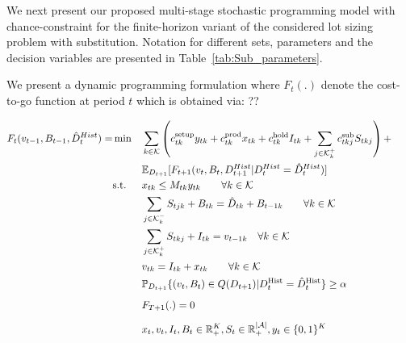 \documentclass[10pt]{article}
\newcommand{\ti}{t} %
\newcommand{\Ti}{T}
\newcommand{\ka}{k} %
\newcommand{\KA}{\mathcal{K}}
\newcommand{\Ka}{K}
\newcommand{\jey}{j} %
\newcommand{\Graf}{\mathcal{A}} %
\newcommand{\Bi}{B} %
\newcommand{\Vi}{v} %
\newcommand{\Es}{S} %
\newcommand{\x}{x} %
\newcommand{\y}{y} %
\newcommand{\InvPos}{inventory level after production }
\newcommand{\Csub}{\mathcal{K}^+_k}
\newcommand{\Psub}{\mathcal{K}^-_k}
\newcommand{\cred}{\color{red!65!black}}
\begin{document}
We next present our proposed multi-stage stochastic programming model with chance-constraint for the finite-horizon variant of the considered lot sizing problem with substitution.
Notation for different sets, parameters and the decision variables are presented in Table~\ref{tab:Sub_parameters}. 

 We present a dynamic programming formulation where $F_t(.)$ denote the cost-to-go function at period $\ti$ which is obtained via: {\cred ??}


\begin{subequations}
\label{DynamicProgrammingNoden}
\begin{flalign}
F_{t}(\Vi_{\ti -1}, \Bi_{\ti -1}, \hat{D}^{Hist}_\ti) =&  \min && \sum_{\ka \in \KA} \left( c^{\text{setup}}_{\ti \ka}\y_{\ti \ka} + c^{\text{prod}}_{\ti \ka}\x_{\ti \ka} + c^{\text{hold}}_{\ti \ka} {I}_{\ti \ka}+  \sum_{\jey \in \Csub}c^{\text{sub}}_{\ti \ka \jey} \Es_{\ti  \ka \jey}\right) +  & \notag \\
& && \mathbb{E}_{D_{\ti+1}}[{F}_{\ti+1}(\Vi_{\ti}, \Bi_{\ti} , {D}^{Hist}_{\ti+1} |{D}^{Hist}_{\ti} = \hat{D}^{Hist}_{\ti})]&&
\label{eq:Dyn_g2_Sub_ST_Production_Flow}& \\
&\text{s.t.} && \x_{\ti \ka} \leq M_{\ti \ka} \y_{\ti \ka} \quad\quad  \forall \ka  \in \KA & & \label{eq:Dyn_Sub_Setup}&\\
& && \sum_{\jey \in  \Psub} {S}_{\ti \jey \ka} + \Bi_{\ti  \ka}  = \hat{D}_{\ti \ka} + {\Bi}_{\ti-1 \ka} \quad\quad \forall \ka  \in \KA&& \label{eq:Bhat}& \\
& &&\sum_{\jey \in  \Csub} {S}_{\ti \ka \jey} + I_{\ti \ka} = {\Vi}_{\ti-1\ka}  \quad \forall \ka  \in \KA& \label{eq:vhat}&\\
& &&\Vi_{\ti \ka} = I_{\ti  \ka} + \x_{\ti  \ka}  \quad\quad \forall \ka  \in \KA  &\label{eq:vdef}&
\\
& &&\mathbb{P}_{D_{\ti+1}}\{ ({\Vi}_{\ti}, {\Bi}_{\ti} ) \in Q(D_{\ti+1} )| D^\text{Hist}_{\ti} = \hat{D}^\text{Hist}_{\ti} \} \geq \alpha &&\label{eq:SL}&
\\*[0.2cm]
& &&F_{\Ti+1}(.) =0 &&\label{eq:SL}&
\\*[0.2cm]
& &&{x}_{ \ti },  {v}_{ \ti },  {I}_{ \ti } , {\Bi}_{ \ti } \in \mathbb{R}_{+}^{\Ka} , {S}_{\ti} \in \mathbb{R}_{+}^{|\Graf|} ,{y}_{ \ti } \in \{0,1\}^{\Ka}&& \label{eq:Dyn_F_Sub_ST_bound1}&
\end{flalign}
\end{subequations}
\end{document}
